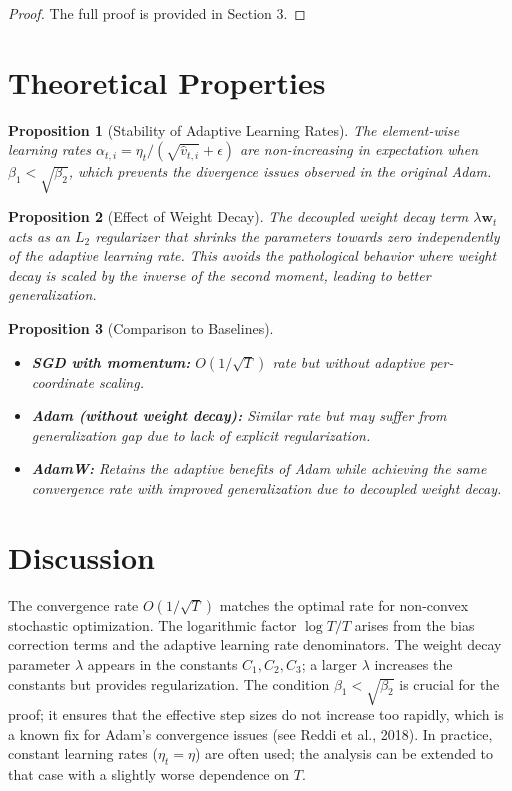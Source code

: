 \documentclass{article}
\theoremstyle{plain}
\newtheorem{proposition}{Proposition}
\theoremstyle{definition}
\renewcommand{\vec}[1]{\boldsymbol{#1}}
\begin{document}
\begin{proof}
The full proof is provided in Section 3.
\end{proof}

\section*{Theoretical Properties}

\begin{proposition}[Stability of Adaptive Learning Rates]
The element-wise learning rates $\alpha_{t,i} = \eta_t / (\sqrt{\hat{v}_{t,i}} + \epsilon)$ are non-increasing in expectation when $\beta_1 < \sqrt{\beta_2}$, which prevents the divergence issues observed in the original Adam.
\end{proposition}

\begin{proposition}[Effect of Weight Decay]
The decoupled weight decay term $\lambda \vec{w}_t$ acts as an $L_2$ regularizer that shrinks the parameters towards zero independently of the adaptive learning rate. This avoids the pathological behavior where weight decay is scaled by the inverse of the second moment, leading to better generalization.
\end{proposition}

\begin{proposition}[Comparison to Baselines]
\begin{itemize}
    \item \textbf{SGD with momentum:} $O(1/\sqrt{T})$ rate but without adaptive per-coordinate scaling.
    \item \textbf{Adam (without weight decay):} Similar rate but may suffer from generalization gap due to lack of explicit regularization.
    \item \textbf{AdamW:} Retains the adaptive benefits of Adam while achieving the same convergence rate with improved generalization due to decoupled weight decay.
\end{itemize}
\end{proposition}

\section*{Discussion}

The convergence rate $O(1/\sqrt{T})$ matches the optimal rate for non-convex stochastic optimization. The logarithmic factor $\log T / T$ arises from the bias correction terms and the adaptive learning rate denominators. The weight decay parameter $\lambda$ appears in the constants $C_1, C_2, C_3$; a larger $\lambda$ increases the constants but provides regularization. The condition $\beta_1 < \sqrt{\beta_2}$ is crucial for the proof; it ensures that the effective step sizes do not increase too rapidly, which is a known fix for Adam's convergence issues (see Reddi et al., 2018). In practice, constant learning rates ($\eta_t = \eta$) are often used; the analysis can be extended to that case with a slightly worse dependence on $T$.
\end{document}
